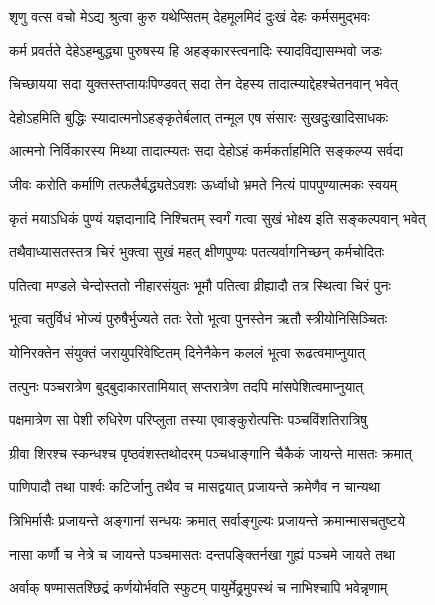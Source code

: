\twolineshloka
{शृणु वत्स वचो मेऽद्य श्रुत्वा कुरु यथेप्सितम्}
{देहमूलमिदं दुःखं देहः कर्मसमुद्भवः} %

\twolineshloka
{कर्म प्रवर्तते देहेऽहम्बुद्ध्या पुरुषस्य हि}
{अहङ्कारस्त्वनादिः स्यादविद्यासम्भवो जडः} %

\twolineshloka
{चिच्छायया सदा युक्तस्तप्तायःपिण्डवत् सदा}
{तेन देहस्य तादात्म्याद्देहश्चेतनवान् भवेत्} %

\twolineshloka
{देहोऽहमिति बुद्धिः स्यादात्मनोऽहङ्कृतेर्बलात्}
{तन्मूल एष संसारः सुखदुःखादिसाधकः} %

\twolineshloka
{आत्मनो निर्विकारस्य मिथ्या तादात्म्यतः सदा}
{देहोऽहं कर्मकर्ताहमिति सङ्कल्प्य सर्वदा} %

\twolineshloka
{जीवः करोति कर्माणि तत्फलैर्बद्ध्यतेऽवशः}
{ऊर्ध्वाधो भ्रमते नित्यं पापपुण्यात्मकः स्वयम्} %

\twolineshloka
{कृतं मयाऽधिकं पुण्यं यज्ञदानादि निश्चितम्}
{स्वर्गं गत्वा सुखं भोक्ष्य इति सङ्कल्पवान् भवेत्} %

\twolineshloka
{तथैवाध्यासतस्तत्र चिरं भुक्त्वा सुखं महत्}
{क्षीणपुण्यः पतत्यर्वागनिच्छन् कर्मचोदितः} %

\twolineshloka
{पतित्वा मण्डले चेन्दोस्ततो नीहारसंयुतः}
{भूमौ पतित्वा व्रीह्यादौ तत्र स्थित्वा चिरं पुनः} %

\twolineshloka
{भूत्वा चतुर्विधं भोज्यं पुरुषैर्भुज्यते ततः}
{रेतो भूत्वा पुनस्तेन ऋतौ स्त्रीयोनिसिञ्चितः} %

\twolineshloka
{योनिरक्तेन संयुक्तं जरायुपरिवेष्टितम्}
{दिनेनैकेन कललं भूत्वा रूढत्वमाप्नुयात्} %

\twolineshloka
{तत्पुनः पञ्चरात्रेण बुद्बुदाकारतामियात्}
{सप्तरात्रेण तदपि मांसपेशित्वमाप्नुयात्} %

\twolineshloka
{पक्षमात्रेण सा पेशी रुधिरेण परिप्लुता}
{तस्या एवाङ्कुरोत्पत्तिः पञ्चविंशतिरात्रिषु} %

\twolineshloka
{ग्रीवा शिरश्च स्कन्धश्च पृष्ठवंशस्तथोदरम्}
{पञ्चधाङ्गानि चैकैकं जायन्ते मासतः क्रमात्} %

\twolineshloka
{पाणिपादौ तथा पार्श्वः कटिर्जानु तथैव च}
{मासद्वयात् प्रजायन्ते क्रमेणैव न चान्यथा} %

\twolineshloka
{त्रिभिर्मासैः प्रजायन्ते अङ्गानां सन्धयः क्रमात्}
{सर्वाङ्गुल्यः प्रजायन्ते क्रमान्मासचतुष्टये} %

\twolineshloka
{नासा कर्णौ च नेत्रे च जायन्ते पञ्चमासतः}
{दन्तपङ्क्तिर्नखा गुह्यं पञ्चमे जायते तथा} %

\twolineshloka
{अर्वाक् षण्मासतश्छिद्रं कर्णयोर्भवति स्फुटम्}
{पायुर्मेढ्रमुपस्थं च नाभिश्चापि भवेन्नृणाम्} %

